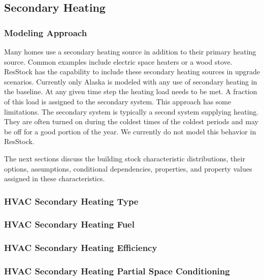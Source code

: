 \subsection{Secondary Heating}
\subsubsection{Modeling Approach}
Many homes use a secondary heating source in addition to their primary heating source. Common examples include electric space heaters or a wood stove. ResStock has the capability to include these secondary heating sources in upgrade scenarios.
Currently only Alaska is modeled with any use of secondary heating in the baseline. At any given time step the heating load needs to be met. A fraction of this load is assigned to the secondary system.
This approach has some limitations. The secondary system is typically a second system supplying heating. They are often turned on during the coldest times of the coldest periods and may be off for a good portion of the year. We currently do not model this behavior in ResStock.

The next sections discuss the building stock characteristic distributions, their options, assumptions, conditional dependencies, properties, and property values assigned in these characteristics.

\subsubsection{HVAC Secondary Heating Type}


\subsubsection{HVAC Secondary Heating Fuel}


\subsubsection{HVAC Secondary Heating Efficiency}


\subsubsection{HVAC Secondary Heating Partial Space Conditioning}


